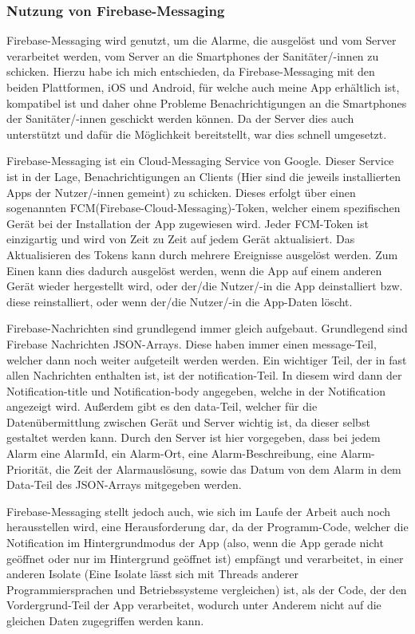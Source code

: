 \subsubsection{Nutzung von Firebase-Messaging}
Firebase-Messaging wird genutzt, um die Alarme, die ausgelöst und vom Server
verarbeitet werden, vom Server an die Smartphones der Sanitäter/-innen zu 
schicken. Hierzu habe ich mich entschieden, da Firebase-Messaging mit den 
beiden Plattformen, iOS und Android, für welche auch meine App erhältlich ist, 
kompatibel ist und daher ohne Probleme Benachrichtigungen an die Smartphones
der Sanitäter/-innen geschickt werden können. Da der Server dies auch 
unterstützt und dafür die Möglichkeit bereitstellt, war dies schnell umgesetzt.

Firebase-Messaging ist ein Cloud-Messaging Service von Google. Dieser 
Service ist in der Lage, Benachrichtigungen an Clients (Hier sind die jeweils installierten Apps
der Nutzer/-innen gemeint) zu schicken. Dieses erfolgt
über einen sogenannten FCM(Firebase-Cloud-Messaging)-Token, welcher einem 
spezifischen Gerät bei der Installation der App zugewiesen wird. Jeder FCM-Token
ist einzigartig und wird von Zeit zu Zeit auf jedem Gerät aktualisiert.
\cite{FCM-Update} Das Aktualisieren des Tokens kann durch mehrere Ereignisse 
ausgelöst werden. Zum Einen kann dies dadurch ausgelöst werden, wenn die App auf 
einem anderen Gerät wieder hergestellt wird, oder der/die Nutzer/-in die App 
deinstalliert bzw. diese reinstalliert, oder wenn der/die Nutzer/-in die App-Daten löscht.

Firebase-Nachrichten sind grundlegend immer gleich aufgebaut. 
Grundlegend sind Firebase Nachrichten JSON-Arrays. Diese haben immer einen
message-Teil, welcher dann noch weiter aufgeteilt werden werden. Ein wichtiger 
Teil, der in fast allen Nachrichten enthalten ist, ist der notification-Teil. 
In diesem wird dann der Notification-title und Notification-body angegeben, 
welche in der Notification angezeigt wird. Außerdem gibt es den data-Teil, 
welcher für die Datenübermittlung zwischen Gerät und Server wichtig ist, da 
dieser selbst gestaltet werden kann. Durch den Server ist hier vorgegeben, 
dass bei jedem Alarm eine AlarmId, ein Alarm-Ort, eine Alarm-Beschreibung,
eine Alarm-Priorität, die Zeit der Alarmauslösung, sowie das Datum von dem 
Alarm in dem Data-Teil des JSON-Arrays mitgegeben werden.

Firebase-Messaging stellt jedoch auch, wie sich im Laufe der Arbeit auch noch
herausstellen wird, eine Herausforderung dar, da der Programm-Code, welcher die
Notification im Hintergrundmodus der App (also,  wenn die App gerade nicht 
geöffnet oder nur im Hintergrund geöffnet ist) empfängt und verarbeitet, in einer 
anderen Isolate (Eine Isolate lässt sich mit Threads anderer 
Programmiersprachen und Betriebssysteme vergleichen\cite{Isolates}) ist, als der Code, 
der den Vordergrund-Teil der App verarbeitet, wodurch unter Anderem nicht 
auf die gleichen Daten zugegriffen werden kann.

